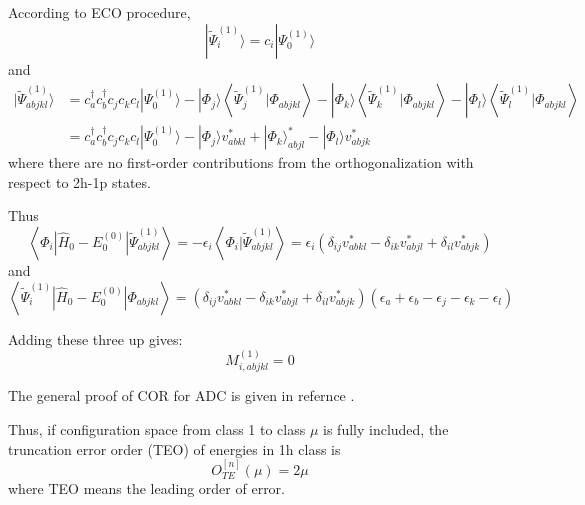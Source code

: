 According to ECO procedure,
\begin{equation}
	| \tilde{\Psi}_{i}^{(1)} \rangle=c_{i} | \Psi_{0}^{(1)} \rangle
\end{equation}
and
\begin{equation}
	\begin{aligned} | \tilde{\Psi}_{a b j k l}^{(1)} \rangle &=c_{a}^{\dagger} c_{b}^{\dagger} c_{j} c_{k} c_{l} | \Psi_{0}^{(1)} \rangle-| \Phi_{j} \rangle\left\langle\tilde{\Psi}_{j}^{(1)} | \Phi_{a b j k l}\right\rangle-| \Phi_{k} \rangle\left\langle\tilde{\Psi}_{k}^{(1)} | \Phi_{a b j k l}\right\rangle-| \Phi_{l} \rangle\left\langle\tilde{\Psi}_{l}^{(1)} | \Phi_{a b j k l}\right\rangle \\ &= c_{a}^{\dagger} c_{b}^{\dagger} c_{j} c_{k} c_{l} | \Psi_{0}^{(1)} \rangle-| \Phi_{j} \rangle v_{a b k l}^{*}+| \Phi_{k} \rangle_{a b j l}^{*}-| \Phi_{l} \rangle v_{a b j k}^{*} \end{aligned}
\end{equation}
where there are no first-order contributions from the orthogonalization with
respect to 2h-1p states.

Thus
\begin{equation}
	\left\langle\Phi_{i}\left|\hat{H}_{0}-E_{0}^{(0)}\right| \tilde{\Psi}_{a b j k l}^{(1)}\right\rangle=-\epsilon_{i}\left\langle\Phi_{i} | \tilde{\Psi}_{a b j k l}^{(1)}\right\rangle=\epsilon_{i}\left(\delta_{i j} v_{a b k l}^{*}-\delta_{i k} v_{a b j l}^{*}+\delta_{i l} v_{a b j k}^{*}\right)
\end{equation}
and
\begin{equation}
	\left\langle\tilde{\Psi}_{i}^{(1)}\left|\hat{H}_{0}-E_{0}^{(0)}\right| \Phi_{a b j k l}\right\rangle=\left(\delta_{i j} v_{a b k l}^{*}-\delta_{i k} v_{a b j l}^{*}+\delta_{i l} v_{a b j k}^{*}\right)\left(\epsilon_{a}+\epsilon_{b}-\epsilon_{j}-\epsilon_{k}-\epsilon_{l}\right)
\end{equation}

Adding these three up gives:
\begin{equation}
	M_{i, a b j k l}^{(1)}=0
\end{equation}

The general proof of COR for ADC is given in refernce \cite{main}.

Thus, if configuration space from class 1 to class $\mu$ is fully included, the truncation error order (TEO) of energies in 1h class is
\begin{equation}
	O_{T E}^{[n]}(\mu)=2\mu
\end{equation}
where TEO means the leading order of error.

